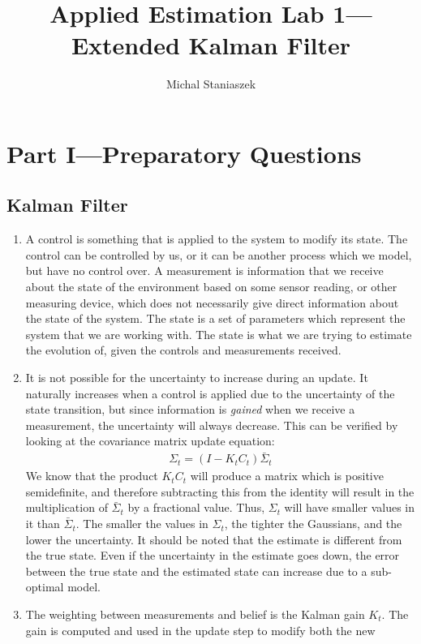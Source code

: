\documentclass[a4paper,12pt]{article}
\title{Applied Estimation Lab 1---Extended Kalman Filter}
\author{Michal Staniaszek}
\begin{document}
\maketitle

\section{Part I---Preparatory Questions}
\subsection{Kalman Filter}
\begin{enumerate}
\item A control is something that is applied to the system to modify its
  state. The control can be controlled by us, or it can be another process which
  we model, but have no control over. A measurement is information that we
  receive about the state of the environment based on some sensor reading, or
  other measuring device, which does not necessarily give direct information
  about the state of the system. The state is a set of parameters which
  represent the system that we are working with. The state is what we are trying
  to estimate the evolution of, given the controls and measurements received.
\item It is not possible for the uncertainty to increase during an update. It
  naturally increases when a control is applied due to the uncertainty of the
  state transition, but since information is \emph{gained} when we receive a
  measurement, the uncertainty will always decrease. This can be verified by
  looking at the covariance matrix update equation:
  \begin{align*}
    \Sigma_t=(I-K_tC_t)\bar{\Sigma}_t
  \end{align*}
  We know that the product $K_tC_t$ will produce a matrix which is positive
  semidefinite, and therefore subtracting this from the identity will result in
  the multiplication of $\bar{\Sigma}_t$ by a fractional value. Thus, $\Sigma_t$
  will have smaller values in it than $\bar{\Sigma}_t$. The smaller the values
  in $\Sigma_t$, the tighter the Gaussians, and the lower the uncertainty. It
  should be noted that the estimate is different from the true state. Even if
  the uncertainty in the estimate goes down, the error between the true
  state and the estimated state can increase due to a sub-optimal model.
\item The weighting between measurements and belief is the Kalman gain
  $K_t$. The gain is computed and used in the update step to modify both the new

\end{enumerate}
\end{document}
